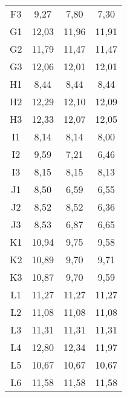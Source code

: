 \begin{center}
\begin{longtable}{cccc}
    F3    & 9,27  & 7,80  & 7,30 \\
    G1    & 12,03 & 11,96 & 11,91 \\
    G2    & 11,79 & 11,47 & 11,47 \\
    G3    & 12,06 & 12,01 & 12,01 \\
    H1    & 8,44  & 8,44  & 8,44 \\
    H2    & 12,29 & 12,10 & 12,09 \\
    H3    & 12,33 & 12,07 & 12,05 \\
    I1    & 8,14  & 8,14  & 8,00 \\
    I2    & 9,59  & 7,21  & 6,46 \\
    I3    & 8,15  & 8,15  & 8,13 \\
    J1    & 8,50  & 6,59  & 6,55 \\
    J2    & 8,52  & 8,52  & 6,36 \\
    J3    & 8,53  & 6,87  & 6,65 \\
    K1    & 10,94 & 9,75  & 9,58 \\
    K2    & 10,89 & 9,70  & 9,71 \\
    K3    & 10,87 & 9,70  & 9,59 \\
    L1    & 11,27 & 11,27 & 11,27 \\
    L2    & 11,08 & 11,08 & 11,08 \\
    L3    & 11,31 & 11,31 & 11,31 \\
    L4    & 12,80 & 12,34 & 11,97 \\
    L5    & 10,67 & 10,67 & 10,67 \\
    L6    & 11,58 & 11,58 & 11,58 \\


\end{longtable}
\end{center}

